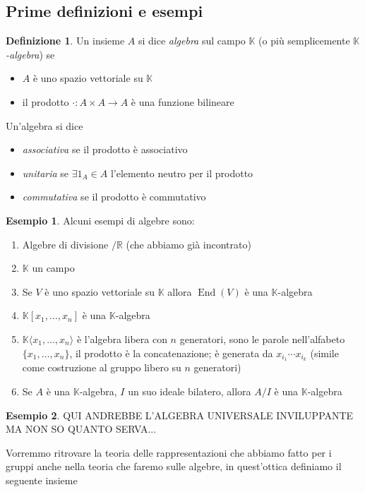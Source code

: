 \documentclass[11pt]{article}
\theoremstyle{plain}
\theoremstyle{definition}
\newtheorem{defn}{Definizione}[section]
\newtheorem{exmp}{Esempio}[section]
\theoremstyle{remark}
\newcommand{\R}{\mathbb{R}}
\newcommand{\K}{\mathbb{K}}
\DeclareMathOperator{\End}{End}
\begin{document}
\subsection{Prime definizioni e esempi}
	\begin{defn}
		Un insieme $A$ si dice \textit{algebra} sul campo $\K$ (o più semplicemente $\K$\textit{-algebra}) se
		\begin{itemize}
			\item $A$ è uno spazio vettoriale su $\K$
			\item il prodotto $\cdot:A\times A\to A$ è una funzione bilineare
		\end{itemize}
		Un'algebra si dice
		\begin{itemize}
			\item \textit{associativa} se il prodotto è associativo
			\item \textit{unitaria} se $\exists 1_A\in A$ l'elemento neutro per il prodotto
			\item \textit{commutativa} se il prodotto è commutativo
		\end{itemize}
	\end{defn}
	\begin{exmp} Alcuni esempi di algebre sono:
		\begin{enumerate}
			\item Algebre di divisione $/\R$ (che abbiamo già incontrato)
			\item $\K$ un campo
			\item Se $V$ è uno spazio vettoriale su $\K$ allora $\End(V)$ è una $\K$-algebra
			\item $\K[x_1,\ldots,x_n]$ è una $\K$-algebra
			\item $\K\langle x_1,\ldots,x_n\rangle$ è l'algebra libera con $n$ generatori, sono le parole nell'alfabeto $\{x_1,\ldots,x_n\}$, il prodotto è la concatenazione; è generata da $x_{i_1}\cdots x_{i_k}$ (simile come costruzione al gruppo libero su $n$ generatori)
			\item Se $A$ è una $\K$-algebra, $I$ un suo ideale bilatero, allora $A/I$ è una $\K$-algebra
		\end{enumerate}
	\end{exmp}
	\begin{exmp}
		QUI ANDREBBE L'ALGEBRA UNIVERSALE INVILUPPANTE MA NON SO QUANTO SERVA...
	\end{exmp}
	Vorremmo ritrovare la teoria delle rappresentazioni che abbiamo fatto per i gruppi anche nella teoria che faremo sulle algebre, in quest'ottica definiamo il seguente insieme
\end{document}
